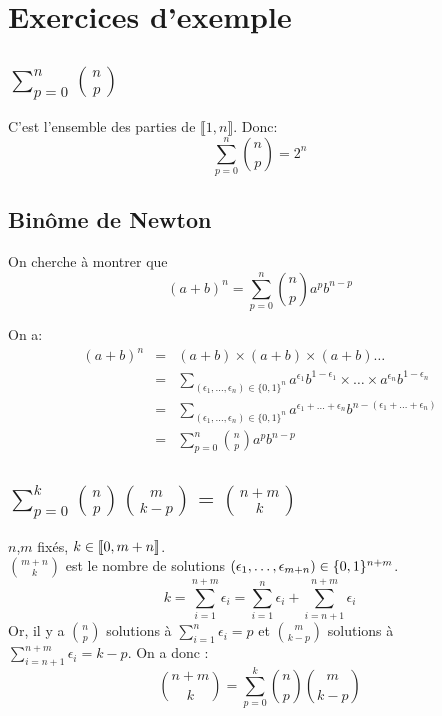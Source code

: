 \section{Exercices d'exemple}
  \subsection{$\sum_{p=0}^n \binom{n}{p}$}
    C'est l'ensemble des parties de $\llbracket 1,n\rrbracket$. Donc:
    \[
      \sum_{p=0}^n \binom{n}{p} = 2^n
    \]

  \subsection{Binôme de Newton}
  On cherche à montrer que \[
    (a+b)^n = \sum_{p=0}^n \binom{n}{p}a^pb^{n-p}
  \]

  On a:
  \begin{eqnarray*}
    (a+b)^n &=& (a+b)\times(a+b)\times(a+b)\dots\\
            &=& \sum_{(\epsilon_1,\dots,\epsilon_n)\in\{0,1\}^n} a^{\epsilon_1} b^{1-\epsilon_1}\times\dots\times a^{\epsilon_n} b^{1-\epsilon_n}\\
            &=& \sum_{(\epsilon_1,\dots,\epsilon_n)\in\{0,1\}^n} a^{\epsilon_1+\dots+\epsilon_n} b^{n-(\epsilon_1+\dots+\epsilon_n)}\\
            &=& \sum_{p=0}^n \binom{n}{p} a^p b^{n-p}
  \end{eqnarray*}


  \subsection{$\sum_{p=0}^k\binom{n}{p}\binom{m}{k-p} = \binom{n+m}{k}$}
    $n$,$m$ fixés, $k\in\left\llbracket0, m+n\right\rrbracket$.\\
    $\binom{m+n}{k}$ est le nombre de solutions
    $\left(\epsilon_1, \dots, \epsilon_{m+n}\right) \in \{0,1\}^{n+m}$.\\
    \[k = \sum_{i=1}^{n+m}\epsilon_i = \sum_{i=1}^{n}\epsilon_i + \sum_{i=n+1}^{n+m}\epsilon_i\]
    Or, il y a $\binom{n}{p}$ solutions à $\sum_{i=1}^{n}\epsilon_i = p$
    et $\binom{m}{k-p}$ solutions à $\sum_{i=n+1}^{n+m}\epsilon_i = k-p$.
    On a donc :
    \[
      \binom{n+m}{k} = \sum_{p=0}^k\binom{n}{p}\binom{m}{k-p}
    \]
